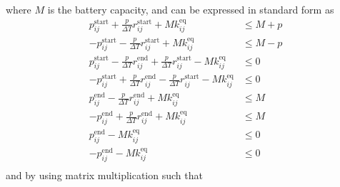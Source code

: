 where $M$ is the battery capacity, and can be expressed in standard form as
\begin{equation} \begin{aligned}
	 p_{ij}^{\text{start}} + \frac{p}{\Delta T} r_{ij}^{\text{start}} + Mk_{ij}^{\text{eq}} &\le M + p \\
	-p_{ij}^{\text{start}} - \frac{p}{\Delta T} r_{ij}^{\text{start}} + Mk_{ij}^{\text{eq}} &\le M - p \\
	 p_{ij}^{\text{start}} - \frac{p}{\Delta T} r_{ij}^{\text{end}}  + \frac{p}{\Delta T}r_{ij}^{\text{start}} - Mk_{ij}^{\text{eq}} &\le 0\\
	-p_{ij}^{\text{start}} + \frac{p}{\Delta T} r_{ij}^{\text{end}}  - \frac{p}{\Delta T}r_{ij}^{\text{start}} - Mk_{ij}^{\text{eq}} &\le 0\\
	 p_{ij}^{\text{end}}   - \frac{p}{\Delta T} r_{ij}^{\text{end}} + Mk_{ij}^{\text{eq}} &\le M \\
	-p_{ij}^{\text{end}}   + \frac{p}{\Delta T} r_{ij}^{\text{end}} + Mk_{ij}^{\text{eq}} &\le M \\
	 p_{ij}^{\text{end}}   - Mk_{ij}^{\text{eq}} &\le 0\\
	-p_{ij}^{\text{end}}   - Mk_{ij}^{\text{eq}}&\le 0 \\
\end{aligned} \end{equation}
and by using matrix multiplication such that
